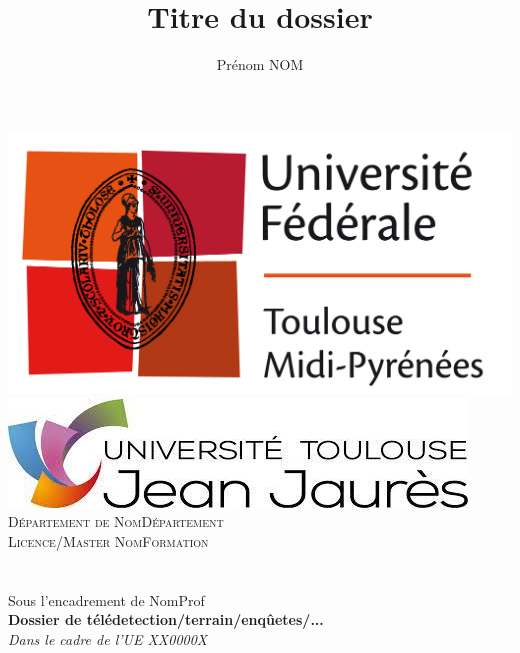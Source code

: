 \documentclass[a4paper,11pt]{article}
\title{Titre du dossier}
\author{Prénom NOM}
\begin{document}
\makeatletter
  \begin{titlepage}
  \centering
      \includegraphics[height=0.08\textheight]{images/Logo_univ_toulouse.jpg}
      \hfill
      \includegraphics[height=0.05\textheight]{images/logo_ut2j.jpg}\\
      \vspace{2cm}
      {\large \textsc{Département de NomDépartement}}\\
      \textsc{Licence/Master NomFormation}\\
    \vspace{2cm}
      {\Huge \textbf{\@title}} \\
    \vspace{0.5cm}
      {\large \@author} \\
      Sous l'encadrement de NomProf\\
    \vfill
      {\large\textbf{Dossier de télédetection/terrain/enqûetes/...}\\
      \textit{Dans le cadre de l'UE XX0000X}}\\
      \vspace*{\fill}
      \@date
  \end{titlepage}
\makeatother
\newpage
\thispagestyle{empty}
\null 
\newpage
\thispagestyle{empty}  
\tableofcontents
 
\printbibliography[title=Bibliographie, heading=bibintoc]
\newpage
\listoffigures
\newpage
\listoftables

\end{document}
